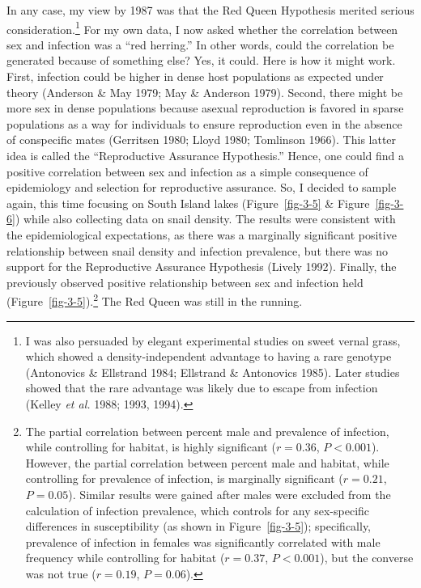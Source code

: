 \documentclass[
  letterpaper,
]{book}
\begin{document}
In any case, my view by 1987 was that the Red Queen Hypothesis merited
serious consideration.\footnote{I was also persuaded by elegant
  experimental studies on sweet vernal grass, which showed a
  density-independent advantage to having a rare genotype (Antonovics \&
  Ellstrand 1984; Ellstrand \& Antonovics 1985). Later studies showed
  that the rare advantage was likely due to escape from infection
  (Kelley \emph{et al.} 1988; 1993, 1994).} For my own data, I now asked
whether the correlation between sex and infection was a ``red herring.''
In other words, could the correlation be generated because of something
else? Yes, it could. Here is how it might work. First, infection could
be higher in dense host populations as expected under theory (Anderson
\& May 1979; May \& Anderson 1979). Second, there might be more sex in
dense populations because asexual reproduction is favored in sparse
populations as a way for individuals to ensure reproduction even in the
absence of conspecific mates (Gerritsen 1980; Lloyd 1980; Tomlinson
1966). This latter idea is called the ``Reproductive Assurance
Hypothesis.'' Hence, one could find a positive correlation between sex
and infection as a simple consequence of epidemiology and selection for
reproductive assurance. So, I decided to sample again, this time
focusing on South Island lakes (Figure~\ref{fig-3-5} \&
Figure~\ref{fig-3-6}) while also collecting data on snail density. The
results were consistent with the epidemiological expectations, as there
was a marginally significant positive relationship between snail density
and infection prevalence, but there was no support for the Reproductive
Assurance Hypothesis (Lively 1992). Finally, the previously observed
positive relationship between sex and infection held
(Figure~\ref{fig-3-5}).\footnote{The partial correlation between percent
  male and prevalence of infection, while controlling for habitat, is
  highly significant (\(r = 0.36\), \(P < 0.001\)). However, the partial
  correlation between percent male and habitat, while controlling for
  prevalence of infection, is marginally significant (\(r = 0.21\),
  \(P = 0.05\)). Similar results were gained after males were excluded
  from the calculation of infection prevalence, which controls for any
  sex-specific differences in susceptibility (as shown in
  Figure~\ref{fig-3-5}); specifically, prevalence of infection in
  females was significantly correlated with male frequency while
  controlling for habitat (\(r = 0.37\), \(P < 0.001\)), but the
  converse was not true (\(r = 0.19\), \(P = 0.06\)).} The Red Queen was
still in the running.
\end{document}
